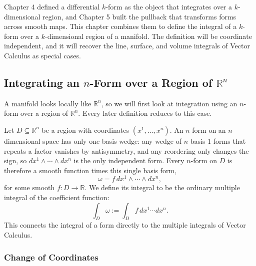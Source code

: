 \documentclass[12pt]{article}
\newcommand{\R}{\mathbb{R}}
\begin{document}
Chapter 4 defined a differential $k$-form as the object that integrates over a $k$-dimensional region, and Chapter 5 built the pullback that transforms forms across smooth maps. This chapter combines them to define the integral of a $k$-form over a $k$-dimensional region of a manifold. The definition will be coordinate independent, and it will recover the line, surface, and volume integrals of Vector Calculus as special cases.

\subsection{Integrating an $n$-Form over a Region of $\R^n$}

A manifold looks locally like $\R^n$, so we will first look at integration using an $n$-form over a region of $\R^n$. Every later definition reduces to this case.

Let $D \subseteq \R^n$ be a region with coordinates $(x^1, \dots, x^n)$. An $n$-form on an $n$-dimensional space has only one basis wedge: any wedge of $n$ basis 1-forms that repeats a factor vanishes by antisymmetry, and any reordering only changes the sign, so $dx^1 \wedge \cdots \wedge dx^n$ is the only independent form. Every $n$-form on $D$ is therefore a smooth function times this single basis form,
\[
\omega = f\,dx^1 \wedge \cdots \wedge dx^n,
\]
for some smooth $f: D \to \R$. We define its integral to be the ordinary multiple integral of the coefficient function:
\[
\int_D \omega := \int_D f\,dx^1 \cdots dx^n.
\]
This connects the integral of a form directly to the multiple integrals of Vector Calculus.

\subsubsection{Change of Coordinates}
\end{document}
